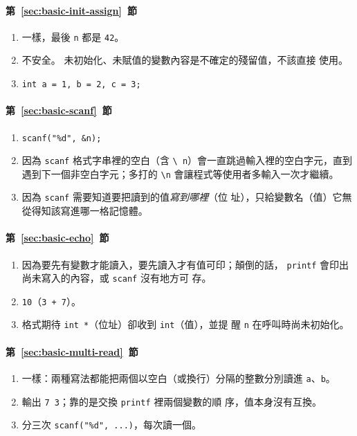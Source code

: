 \paragraph{第~\ref{sec:basic-init-assign}~節}
\begin{enumerate}
\item 一樣，最後 \texttt{n} 都是 \texttt{42}。
\item 不安全。 未初始化、未賦值的變數內容是不確定的殘留值，不該直接
使用。
\item \texttt{int a = 1, b = 2, c = 3;}
\end{enumerate}

\paragraph{第~\ref{sec:basic-scanf}~節}
\begin{enumerate}
\item \texttt{scanf("\%d", \&n);}
\item 因為 \texttt{scanf} 格式字串裡的空白（含 \texttt{\textbackslash
n}）會一直跳過輸入裡的空白字元，直到遇到下一個非空白字元；多打的
\texttt{\textbackslash n} 會讓程式等使用者多輸入一次才繼續。
\item 因為 \texttt{scanf} 需要知道要把讀到的值\emph{寫到哪裡}（位
址），只給變數名（值）它無從得知該寫進哪一格記憶體。
\end{enumerate}

\paragraph{第~\ref{sec:basic-echo}~節}
\begin{enumerate}
\item 因為要先有變數才能讀入，要先讀入才有值可印；顛倒的話，
\texttt{printf} 會印出尚未寫入的內容，或 \texttt{scanf} 沒有地方可
存。
\item \texttt{10}（\texttt{3 + 7}）。
\item 格式期待 \texttt{int *}（位址）卻收到 \texttt{int}（值），並提
醒 \texttt{n} 在呼叫時尚未初始化。
\end{enumerate}

\paragraph{第~\ref{sec:basic-multi-read}~節}
\begin{enumerate}
\item 一樣：兩種寫法都能把兩個以空白（或換行）分隔的整數分別讀進
\texttt{a}、\texttt{b}。
\item 輸出 \texttt{7 3}；靠的是交換 \texttt{printf} 裡兩個變數的順
序，值本身沒有互換。
\item 分三次 \texttt{scanf("\%d", ...)}，每次讀一個。
\end{enumerate}

